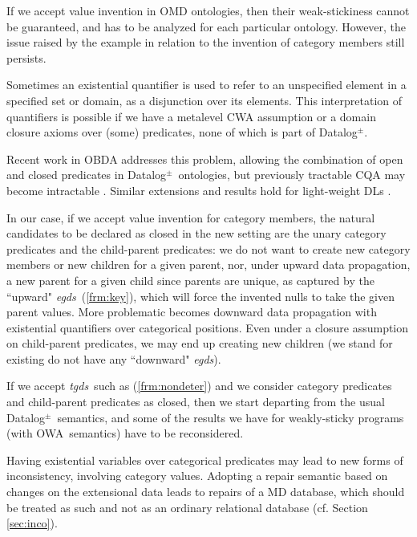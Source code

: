 \documentclass[format=acmsmall, review=false, screen=true]{acmart}
\newcommand{\ignore}[1]{}
\newcommand{\dpm}{{Datalog}$^\pm$}
\newcommand{\owa}{OWA}
\newcommand{\egds}{{\em egds}}
\newcommand{\tgds}{{\em tgds}}
\newcommand{\blue}[1]{{#1}}
\newcommand{\comlb}[1]{{\vspace{2mm}\noindent \bf \blue{COMM(LEO):}}~ #1 \hfill {\bf
    END.}\\}
\newcommand{\commos}[1]{{\vspace{2mm}\noindent \bf \blue{COMM(MOSTAFA):}}~ #1 \hfill {\bf
    END.}\\}
\begin{document}
If we accept value invention in OMD ontologies, then their weak-stickiness cannot be guaranteed, and has to be analyzed for each particular ontology. However, the issue raised by the example in relation to the invention of category members still persists.

Sometimes an existential quantifier is used  to  refer  to an unspecified element in a specified set or domain, as a disjunction over its elements. This interpretation of quantifiers is possible
if we have a metalevel CWA assumption or a domain closure axioms \cite{reiter} over (some) predicates, none of which is part of  \dpm.

Recent work in OBDA addresses this problem, allowing the combination of open and closed predicates in
\dpm \ ontologies, but previously tractable CQA may become intractable \cite{ahmet1}. Similar extensions and results hold for light-weight DLs \cite{seylan,franconi,lutz13,lutz15}.

\ignore{
\comlb{We should give the more prominent references for Simkus. I think Lutz has work on closed predicates in DL.}
\commos{Sure, Here I added these references from Lutz (Seylan is also the co-author in both Lutz's and Franconi's papers): \cite{seylan,lutz13,lutz15}. About Simkus, the better reference is~\cite{ahmet2} and I commented the other one.} }

In our case, if we accept value invention for category members, the natural candidates to be declared as closed in the new setting are the
unary category predicates and the child-parent predicates: we do not want to create new category members or new children for a given parent, nor, under upward data propagation,   a new parent for a given child since parents are unique, as captured by the ``upward" \egds \ (\ref{frm:key}), which
 will force the invented nulls to take the given parent values.
More problematic becomes downward data propagation with existential quantifiers over  categorical positions. Even under a closure assumption on child-parent predicates, we may end up creating new children (we  stand for existing do not have any ``downward" \egds).

If we accept  \tgds \ such as (\ref{frm:nondeter}) and  we consider  category predicates and child-parent predicates as closed, then we start departing from the usual \dpm \ semantics, and some of the results we have  for weakly-sticky programs (with \owa \ semantics) have to be reconsidered.

Having existential variables over categorical predicates may lead to new forms of inconsistency, involving category values. Adopting a repair semantic based on changes on the extensional data leads to repairs of a MD database, which should be treated as such and not as an ordinary relational database (cf. Section \ref{sec:inco}).
\end{document}
